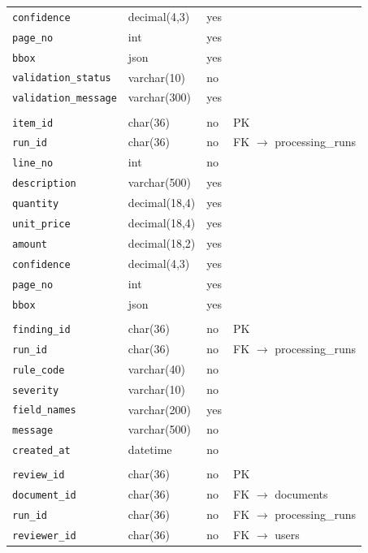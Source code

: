 {\begin{longtable}{L{4.2cm}L{3.4cm}L{1.1cm}L{5.0cm}}
\texttt{confidence} & decimal(4,3) & yes & \\
\texttt{page\_no} & int & yes & \\
\texttt{bbox} & json & yes & \\
\texttt{validation\_status} & varchar(10) & no & \\
\texttt{validation\_message} & varchar(300) & yes & \\
\\
\texttt{item\_id} & char(36) & no & PK\\
\texttt{run\_id} & char(36) & no & FK $\rightarrow$ processing\_runs\\
\texttt{line\_no} & int & no & \\
\texttt{description} & varchar(500) & yes & \\
\texttt{quantity} & decimal(18,4) & yes & \\
\texttt{unit\_price} & decimal(18,4) & yes & \\
\texttt{amount} & decimal(18,2) & yes & \\
\texttt{confidence} & decimal(4,3) & yes & \\
\texttt{page\_no} & int & yes & \\
\texttt{bbox} & json & yes & \\
\\
\texttt{finding\_id} & char(36) & no & PK\\
\texttt{run\_id} & char(36) & no & FK $\rightarrow$ processing\_runs\\
\texttt{rule\_code} & varchar(40) & no & \\
\texttt{severity} & varchar(10) & no & \\
\texttt{field\_names} & varchar(200) & yes & \\
\texttt{message} & varchar(500) & no & \\
\texttt{created\_at} & datetime & no & \\
\\
\texttt{review\_id} & char(36) & no & PK\\
\texttt{document\_id} & char(36) & no & FK $\rightarrow$ documents\\
\texttt{run\_id} & char(36) & no & FK $\rightarrow$ processing\_runs\\
\texttt{reviewer\_id} & char(36) & no & FK $\rightarrow$ users\\

\end{longtable}}
